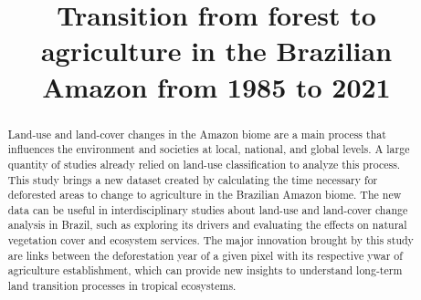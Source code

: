 \documentclass[essd, manuscript]{copernicus}
\begin{document}
\title{Transition from forest to agriculture in the Brazilian Amazon from 1985 to 2021}











\received{}
\pubdiscuss{} %
\revised{}
\accepted{}
\published{}




\maketitle


\begin{abstract}
Land-use and land-cover changes in the Amazon biome are a main process that influences the environment and societies at local, national, and global levels. A large quantity of studies already relied on land-use classification to analyze this process. This study brings a new dataset created by calculating the time necessary for deforested areas to change to agriculture in the Brazilian Amazon biome. The new data can be useful in interdisciplinary studies about land-use and land-cover change analysis in Brazil, such as exploring its drivers and evaluating the effects on natural vegetation cover and ecosystem services. The major innovation brought by this study are links between the deforestation year of a given pixel with its respective ywar of agriculture establishment, which can provide new insights to understand long-term land transition processes in tropical ecosystems.
\end{abstract}
\end{document}
